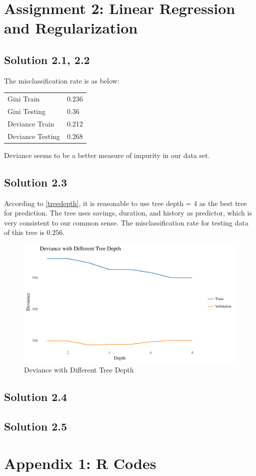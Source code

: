 \documentclass[11pt,english]{article}
\begin{document}
\section*{Assignment 2: Linear Regression and Regularization}


\subsection*{Solution 2.1, 2.2}
The misclassification rate is as below:\\

\begin{tabular}{ l l }
  Gini Train & 0.236 \\
  Gini Testing & 0.36 \\
  Deviance Train & 0.212 \\
  Deviance Testing & 0.268
\end{tabular}

Deviance seems to be a better measure of impurity in our data set.

\subsection*{Solution 2.3}
According to \autoref{treedepth}, it is reasonable to use tree depth = 4
as the best tree for prediction. The tree uses savings, duration, and
history as predictor, which is very consistent to our common sense.
The misclassification rate for testing data of this tree is $0.256$.

\begin{figure}[H]
  \centering
  \includegraphics[width = 1.13\textwidth]{treedepth.pdf}
  \caption{Deviance with Different Tree Depth}
  \label{treedepth}
\end{figure}


\subsection*{Solution 2.4}

\subsection*{Solution 2.5}



\newpage
{}

\section*{Appendix 1: R Codes}
\label{ax1}

\end{document}
